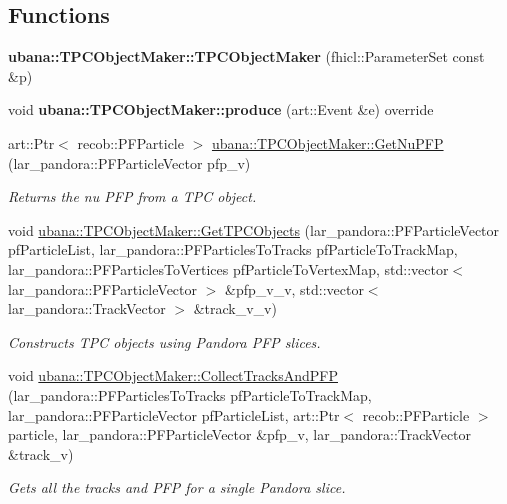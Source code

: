 \subsection*{\-Functions}
\begin{DoxyCompactItemize}
\item 
\hypertarget{group__UBXSec_gae030804e6aa4085bef6be52e9618fee9}{{\bfseries ubana\-::\-T\-P\-C\-Object\-Maker\-::\-T\-P\-C\-Object\-Maker} (fhicl\-::\-Parameter\-Set const \&p)}\label{group__UBXSec_gae030804e6aa4085bef6be52e9618fee9}

\item 
\hypertarget{group__UBXSec_ga07c03a811bbaccdbeb20b2b7714034c9}{void {\bfseries ubana\-::\-T\-P\-C\-Object\-Maker\-::produce} (art\-::\-Event \&e) override}\label{group__UBXSec_ga07c03a811bbaccdbeb20b2b7714034c9}

\item 
art\-::\-Ptr$<$ recob\-::\-P\-F\-Particle $>$ \hyperlink{group__UBXSec_ga6a47470b5f5690a3626e14bc9f6f360c}{ubana\-::\-T\-P\-C\-Object\-Maker\-::\-Get\-Nu\-P\-F\-P} (lar\-\_\-pandora\-::\-P\-F\-Particle\-Vector pfp\-\_\-v)
\begin{DoxyCompactList}\small\item\em \-Returns the nu \-P\-F\-P from a \-T\-P\-C object. \end{DoxyCompactList}\item 
void \hyperlink{group__UBXSec_gaf90fb2bf60601767e1db3bd1ca635433}{ubana\-::\-T\-P\-C\-Object\-Maker\-::\-Get\-T\-P\-C\-Objects} (lar\-\_\-pandora\-::\-P\-F\-Particle\-Vector pf\-Particle\-List, lar\-\_\-pandora\-::\-P\-F\-Particles\-To\-Tracks pf\-Particle\-To\-Track\-Map, lar\-\_\-pandora\-::\-P\-F\-Particles\-To\-Vertices pf\-Particle\-To\-Vertex\-Map, std\-::vector$<$ lar\-\_\-pandora\-::\-P\-F\-Particle\-Vector $>$ \&pfp\-\_\-v\-\_\-v, std\-::vector$<$ lar\-\_\-pandora\-::\-Track\-Vector $>$ \&track\-\_\-v\-\_\-v)
\begin{DoxyCompactList}\small\item\em \-Constructs \-T\-P\-C objects using \-Pandora \-P\-F\-P slices. \end{DoxyCompactList}\item 
void \hyperlink{group__UBXSec_ga39991fa551ce05bcb4fb10db4f80ab49}{ubana\-::\-T\-P\-C\-Object\-Maker\-::\-Collect\-Tracks\-And\-P\-F\-P} (lar\-\_\-pandora\-::\-P\-F\-Particles\-To\-Tracks pf\-Particle\-To\-Track\-Map, lar\-\_\-pandora\-::\-P\-F\-Particle\-Vector pf\-Particle\-List, art\-::\-Ptr$<$ recob\-::\-P\-F\-Particle $>$ particle, lar\-\_\-pandora\-::\-P\-F\-Particle\-Vector \&pfp\-\_\-v, lar\-\_\-pandora\-::\-Track\-Vector \&track\-\_\-v)
\begin{DoxyCompactList}\small\item\em \-Gets all the tracks and \-P\-F\-P for a single \-Pandora slice. \end{DoxyCompactList}\end{DoxyCompactItemize}


